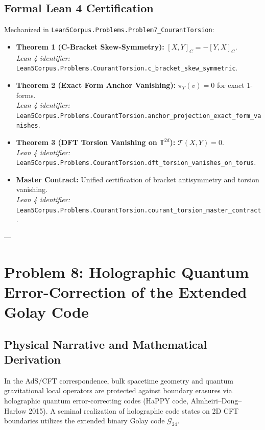 \documentclass[11pt,a4paper]{article}
\begin{document}
\subsection{Formal Lean 4 Certification}
Mechanized in \texttt{Lean5Corpus.Problems.Problem7\_CourantTorsion}:
\begin{itemize}
    \item \textbf{Theorem 1 (C-Bracket Skew-Symmetry):} $[X, Y]_C = -[Y, X]_C$. \\
    \textit{Lean 4 identifier:} \texttt{Lean5Corpus.Problems.CourantTorsion.c\_bracket\_skew\_symmetric}.
    \item \textbf{Theorem 2 (Exact Form Anchor Vanishing):} $\pi_T(v) = 0$ for exact 1-forms. \\
    \textit{Lean 4 identifier:} \texttt{Lean5Corpus.Problems.CourantTorsion.anchor\_projection\_exact\_form\_vanishes}.
    \item \textbf{Theorem 3 (DFT Torsion Vanishing on $\mathbb{T}^{2d}$):} $\mathcal{T}(X, Y) = 0$. \\
    \textit{Lean 4 identifier:} \texttt{Lean5Corpus.Problems.CourantTorsion.dft\_torsion\_vanishes\_on\_torus}.
    \item \textbf{Master Contract:} Unified certification of bracket antisymmetry and torsion vanishing. \\
    \textit{Lean 4 identifier:} \texttt{Lean5Corpus.Problems.CourantTorsion.courant\_torsion\_master\_contract}.
\end{itemize}

---

\section{Problem 8: Holographic Quantum Error-Correction of the Extended Golay Code}

\subsection{Physical Narrative and Mathematical Derivation}
In the AdS/CFT correspondence, bulk spacetime geometry and quantum gravitational local operators are protected against boundary erasures via holographic quantum error-correcting codes (HaPPY code, Almheiri--Dong--Harlow 2015). A seminal realization of holographic code states on 2D CFT boundaries utilizes the extended binary Golay code $\mathcal{G}_{24}$.
\end{document}
